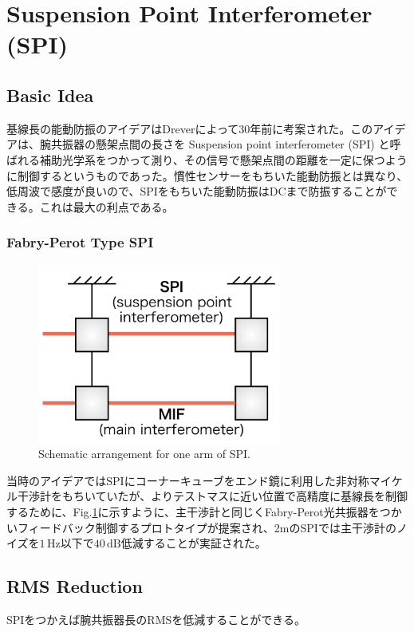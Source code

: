\section{Suspension Point Interferometer (SPI)}
\subsection{Basic Idea}
基線長の能動防振のアイデアはDreverによって30年前に考案された。このアイデアは、腕共振器の懸架点間の長さを Suspension point interferometer (SPI) と呼ばれる補助光学系をつかって測り、その信号で懸架点間の距離を一定に保つように制御するというものであった\cite{drever1987outline}。慣性センサーをもちいた能動防振とは異なり、低周波で感度が良いので、SPIをもちいた能動防振はDCまで防振することができる。これは最大の利点である。

\subsubsection{Fabry-Perot Type SPI}
\begin{figure}[h]
  \begin{center}   
    \includegraphics[width=8cm]{./img_chap5/img508.png}
    \caption{Schematic arrangement for one arm of SPI.} \label{img:img508}
  \end{center}
\end{figure}
当時のアイデアではSPIにコーナーキューブをエンド鏡に利用した非対称マイケル干渉計をもちいていたが、よりテストマスに近い位置で高精度に基線長を制御するために、Fig.\ref{img:img508}に示すように、主干渉計と同じくFabry-Perot光共振器をつかいフィードバック制御するプロトタイプが提案され\cite{drever2002extension}、2mのSPIでは主干渉計のノイズを$1\,\mathrm{Hz}$以下で$40\,\mathrm{dB}$低減することが実証された\cite{aso2004stabilization}。

\subsection{RMS Reduction}
SPIをつかえば腕共振器長のRMSを低減することができる。


